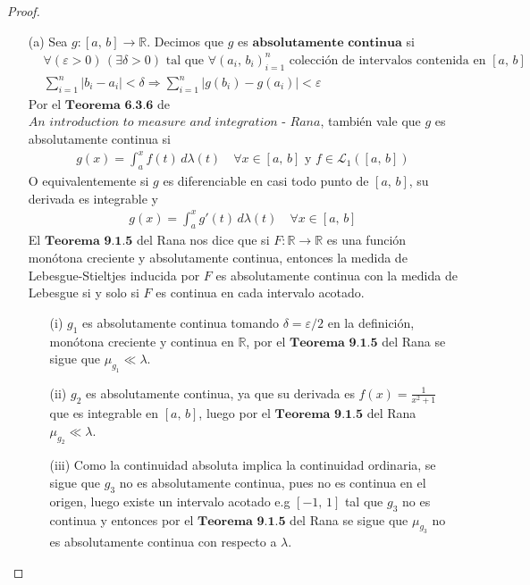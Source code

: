 \documentclass[12pt]{article}
\begin{document}
\begin{proof}
    \begin{itemize}
        \item[(a)] Sea \(g : [a \text{, }b] \to \mathbb{R} \). Decimos que \(g \) es \(\textbf{absolutamente continua} \) si \begin{align*}
                   & \forall (\varepsilon > 0) \, (\exists \delta > 0) \text{ tal que } \forall (a_i\text{, } b_i)_{i = 1}^n \text{ colección de intervalos contenida en } [a\text{, }b] \\
                   & \sum_{i = 1}^n |b_i - a_i| < \delta \Rightarrow \sum_{i = 1}^n |g(b_i) - g(a_i)| < \varepsilon
              \end{align*}
              Por el \(\textbf{Teorema 6.3.6} \) de \(\textit{An introduction to measure and integration - Rana} \), también vale que \(g \) es absolutamente continua si \begin{align*}
                  g(x) = \int_a^x f(t) \, d\lambda(t) \quad \forall x \in [a\text{, }b] \text{ y } f \in \mathcal{L}_1([a\text{, }b])
              \end{align*}
              O equivalentemente si \(g \) es diferenciable en casi todo punto de \([a\text{, }b] \), su derivada es integrable y \begin{align*}
                  g(x) = \int_a^x g'(t) \, d\lambda(t) \quad \forall x \in [a\text{, }b]
              \end{align*}
              El \(\textbf{Teorema 9.1.5} \) del Rana nos dice que si \(F: \mathbb{R} \to \mathbb{R} \) es una función monótona creciente y absolutamente continua, entonces la medida de Lebesgue-Stieltjes inducida por \(F \) es absolutamente continua con la medida de Lebesgue si y solo si \(F \) es continua en cada intervalo acotado.
              \begin{itemize}
                  \item[(i)] \(g_1 \) es absolutamente continua tomando \(\delta = \varepsilon / 2 \) en la definición, monótona creciente y continua en \(\mathbb{R} \), por el \(\textbf{Teorema 9.1.5} \) del Rana se sigue que \(\mu_{g_1} \ll \lambda \).
                  \item[(ii)] \(g_2 \) es absolutamente continua, ya que su derivada es \(f(x) = \frac{1}{x^2+1} \) que es integrable en \([a\text{, }b] \), luego por el \(\textbf{Teorema 9.1.5} \) del Rana \(\mu_{g_2} \ll \lambda \).
                  \item[(iii)] Como la continuidad absoluta implica la continuidad ordinaria, se sigue que \(g_3 \) no es absolutamente continua, pues no es continua en el origen, luego existe un intervalo acotado e.g \([-1\text{, }1] \) tal que \(g_3 \) no es continua y entonces por el \(\textbf{Teorema 9.1.5} \) del Rana se sigue que \(\mu_{g_3} \) no es absolutamente continua con respecto a \(\lambda \).

\end{itemize}
\end{itemize}
\end{proof}
\end{document}
